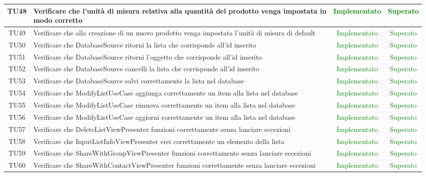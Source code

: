 \begin{center}
\begin{longtable}{|c|>{\centering}m{10cm}|c|c|}
		TU48 & Verificare che l'unità di misura relativa alla quantità del prodotto venga impostata in modo corretto & \textcolor{Green}{Implementato} & \textcolor{Green}{Superato} \\ \hline
		TU49 & Verificare che alla creazione di un nuovo prodotto venga impostata l'unità di misura di default & \textcolor{Green}{Implementato} & \textcolor{Green}{Superato} \\ \hline
		TU50 & Verificare che DatabaseSource ritorni la lista che corrisponde all'id inserito & \textcolor{Green}{Implementato} & \textcolor{Green}{Superato} \\ \hline
		TU51 & Verificare che DatabaseSource ritorni l'oggetto che corrisponde all'id inserito & \textcolor{Green}{Implementato} & \textcolor{Green}{Superato} \\ \hline
		TU52 & Verificare che DatabaseSource cancelli la lista che corrisponde all'id inserito & \textcolor{Green}{Implementato} & \textcolor{Green}{Superato} \\ \hline
		TU53 & Verificare che DatabaseSource salvi correttamente la lista nel database & \textcolor{Green}{Implementato} & \textcolor{Green}{Superato} \\ \hline
		TU54 & Verificare che ModifyListUseCase aggiunga correttamente un item alla lista nel database & \textcolor{Green}{Implementato} & \textcolor{Green}{Superato} \\ \hline
		TU55 & Verificare che ModifyListUseCase rimuova correttamente un item alla lista nel database & \textcolor{Green}{Implementato} & \textcolor{Green}{Superato} \\ \hline
		TU56 & Verificare che ModifyListUseCase aggiorni correttamente un item alla lista nel database & \textcolor{Green}{Implementato} & \textcolor{Green}{Superato} \\ \hline
		TU57 & Verificare che DeleteListViewPresenter funzioni correttamente senza lanciare eccezioni & \textcolor{Green}{Implementato} & \textcolor{Green}{Superato} \\ \hline
		TU58 & Verificare che InputListInfoViewPresenter crei correttamente un elemento della lista & \textcolor{Green}{Implementato} & \textcolor{Green}{Superato} \\ \hline
		TU59 & Verificare che ShareWithGroupViewPresenter funzioni correttamente senza lanciare eccezioni & \textcolor{Green}{Implementato} & \textcolor{Green}{Superato} \\ \hline
		TU60 & Verificare che ShareWithContactViewPresenter funzioni correttamente senza lanciare eccezioni & \textcolor{Green}{Implementato} & \textcolor{Green}{Superato} \\ \hline
	\end{longtable}
\end{center}
